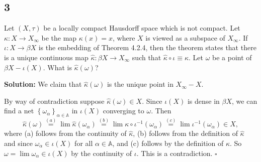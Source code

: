 \documentclass[12pt]{article}
\newcounter{ProofCounter}
\newenvironment{Solution}{\stepcounter{ProofCounter}\textbf{Solution:}}{\hfill$\square$}
\begin{document}
\subsection*{3}
\begin{tcolorbox}
  Let $(X, \tau)$ be a locally compact Hausdorff space which is not compact. 
  Let $\kappa : X \rightarrow X_{\infty}$ be the map $\kappa(x) = x$, where $X$ is viewed as a subspace of $X_{\infty}$. If $\iota: X \rightarrow \beta
  X$ is the embedding of Theorem 4.2.4, then the theorem states that there is a unique continuous map $\hat{\kappa} : \beta X \rightarrow X_{\infty}$
  such that $\hat{\kappa} \circ \iota \equiv \kappa$. Let $\omega$ be a point of $\beta X - \iota(X)$. What is $\hat{\kappa}(\omega)$?
\end{tcolorbox}
\begin{Solution}
  We claim that $\hat{\kappa}(\omega)$ is the unique point in $X_{\infty} - X$.

  By way of contradiction suppose $\hat{\kappa}(\omega) \in X$.
  Since $\iota(X)$ is dense in $\beta X$, we can find a net $\left\{ \omega_{\alpha} \right\}_{\alpha\in\mathbb{A}}$ in $\iota(X)$ converging to $\omega$.
  Then
  \[
    \hat{\kappa}(\omega) \stackrel{(a)}{=} \lim \hat{\kappa}(\omega_\alpha) \stackrel{(b)}{=} \lim\kappa\circ
    \iota^{-1}(\omega_\alpha) \stackrel{(c)}{=}
    \lim\iota^{-1}(\omega_\alpha) \in X,
  \]
  where (a) follows from the continuity of $\hat{\kappa}$, (b) follows from the definition of $\hat{\kappa}$ and since $\omega_\alpha \in \iota(X)$
  for all $\alpha \in \mathbb{A}$, and
  (c) follows by the definition of $\kappa$.
  So $\omega = \lim \omega_\alpha \in \iota(X)$ by the continuity of $\iota$. This is a contradiction.
\end{Solution}
\end{document}
